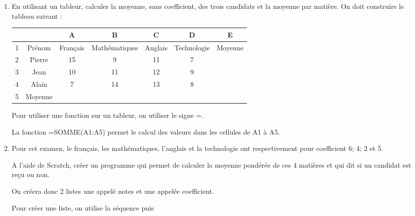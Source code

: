 \documentclass[openany]{book}
\begin{document}
\begin{enumerate}
\item En utilisant un tableur, calculer la moyenne, sans coefficient, des trois candidats et la moyenne par matière. On doit construire le tableau suivant :

\begin{center}
  \begin{tabular}{|c|c|c|c|c|c|c|}
\hline  
{\cellcolor{gray}}&{\cellcolor{gray}}&{\cellcolor{gray}A}&{\cellcolor{gray}B}&{\cellcolor{gray}C}&{\cellcolor{gray}D}&{\cellcolor{gray}E} \\
\hline
{\cellcolor{gray}1}&Prénom&Français&Mathématiques&Anglais&Technologie&Moyenne\\
\hline
{\cellcolor{gray}2}&Pierre&15&9&11&7&\\
\hline
{\cellcolor{gray}3}&Jean&10&11&12&9&\\
\hline
{\cellcolor{gray}4}&Alain&7&14&13&8&\\
\hline
{\cellcolor{gray}5}&Moyenne&&&&&\\
\hline
  \end{tabular}
\end{center}

\begin{Rappel}
Pour utiliser une fonction sur un tableur, on utiliser le signe =. \par
La fonction =SOMME(A1:A5) permet le calcul des valeurs dans les cellules de A1 à A5.
\end{Rappel}


\item Pour cet examen, le français, les mathématiques, l'anglais et la
technologie ont respectivement pour coefficient 6; 4; 2 et 5.\par
A l'aide de Scratch, créer un programme qui permet de calculer la moyenne pondérée de ces 4 matières et qui dit si un candidat est reçu ou non.

\vspace{0.4cm}
On  créera donc 2 listes une appelé notes et une appelée coefficient.

\begin{Rappel}
Pour créer une liste, on utilise la séquence  puis 
\end{Rappel}



\end{enumerate}
\end{document}
